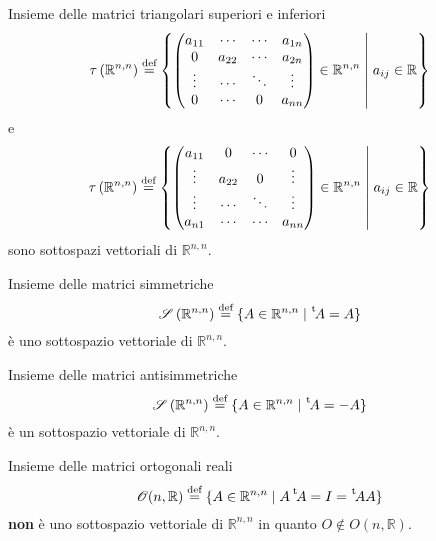 \begin{Def}{Insieme delle matrici triangolari superiori e inferiori}
    \begin{equation*}
      \tau \left( \mathbb{R}^{n,n} \right)\bydef \left\{
        \begin{pmatrix}
          a_{11} & \cdots & \cdots & a_{1n}\\
          0 & a_{22} & \cdots & a_{2n}\\
          \vdots & \cdots & \ddots & \vdots\\
          0 & \cdots & 0 & a_{nn}
        \end{pmatrix}\in\mathbb{R}^{n,n}
        \Setsuchthat a_{ij}\in\mathbb{R}
      \right\}
    \end{equation*}
    e
    \begin{equation*}
      \tau \left( \mathbb{R}^{n,n} \right)\bydef \left\{
        \begin{pmatrix}
          a_{11} & 0 & \cdots & 0\\
          \vdots & a_{22} & 0 & \vdots\\
          \vdots & \cdots & \ddots & \vdots\\
          a_{n1} & \cdots & \cdots & a_{nn}
        \end{pmatrix}\in\mathbb{R}^{n,n}
        \Setsuchthat a_{ij}\in\mathbb{R}
      \right\}
    \end{equation*}
    sono sottospazi vettoriali di $\mathbb{R}^{n,n}$.
\end{Def}

\begin{Def}{Insieme delle matrici simmetriche}
  \begin{equation*}
    \mathscr{S}\left( \mathbb{R}^{n,n} \right)\bydef \left\{A\in\mathbb{R}^{n,n}\Setsuchthat
    \transp A = A\right\}
  \end{equation*}
  è uno sottospazio vettoriale di $\mathbb{R}^{n,n}$.
\end{Def}

\begin{Def}{Insieme delle matrici antisimmetriche}
  \begin{equation*}
    \mathscr{S}\left( \mathbb{R}^{n,n} \right)\bydef \left\{A\in\mathbb{R}^{n,n}\Setsuchthat
    \transp A = -A\right\}
  \end{equation*}
  è un sottospazio vettoriale di $\mathbb{R}^{n,n}$.
\end{Def}

\begin{Def}{Insieme delle matrici ortogonali reali}
  \begin{equation*}
    \mathscr{O}(n,\mathbb{R})\bydef \left\{ A\in\mathbb{R}^{n,n}\Setsuchthat A\transp A
    = I = \transp A A\right\}
  \end{equation*}
  \textbf{non} è uno sottospazio vettoriale di $\mathbb{R}^{n,n}$ in quanto $O\notin
  O(n,\mathbb{R})$.
\end{Def}
